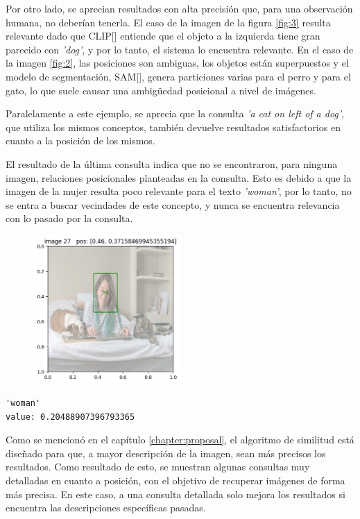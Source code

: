 Por otro lado, se aprecian resultados con alta precisión que, para una observación humana, no deberían tenerla. El caso de la imagen de la figura \ref{fig:3} resulta relevante dado que CLIP[\cite{clip}] entiende que el objeto a la izquierda tiene gran parecido con \textit{'dog'}, y por lo tanto, el sistema lo encuentra relevante. En el caso de la imagen \ref{fig:2}, las posiciones son ambiguas, los objetos est\'an superpuestos y el modelo de segmentación, SAM[\cite{sam-paper}], genera particiones varias para el perro y para el gato, lo que suele causar una ambigüedad posicional a nivel de im\'agenes.

Paralelamente a este ejemplo, se aprecia que la consulta \textit{'a cat on left of a dog'}, que utiliza los mismos conceptos, también devuelve resultados satisfactorios en cuanto a la posición de los mismos.

El resultado de la última consulta indica que no se encontraron, para ninguna imagen, relaciones posicionales planteadas en la consulta. Esto es debido a que la imagen de la mujer resulta poco relevante para el texto \textit{'woman'}, por lo tanto, no se entra a buscar vecindades de este concepto, y nunca se encuentra relevancia con lo pasado por la consulta.


\begin{figure}[H]
\centering
 \includegraphics[width=0.5\textwidth]{Graphics/woman.png}
 \caption{ }
 \label{fig:woman}
\end{figure}

\begin{verbatim}
'woman'
value: 0.20488907396793365
\end{verbatim}

Como se mencionó en el capítulo \ref{chapter:proposal}, el algoritmo de similitud est\'a diseñado para que, a mayor descripción de la imagen, sean m\'as precisos los resultados. Como resultado de esto, se muestran algunas consultas muy detalladas en cuanto a posición, con el objetivo de recuperar im\'agenes de forma m\'as precisa. En este caso, a una consulta detallada solo mejora los resultados si encuentra las descripciones específicas pasadas.

